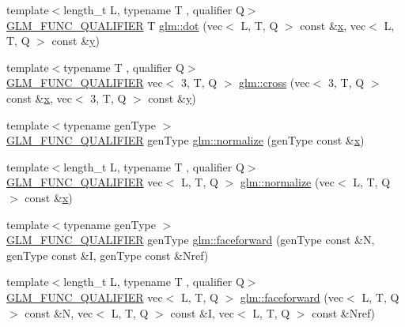 \begin{DoxyCompactItemize}
\item 
{\footnotesize template$<$length\+\_\+t L, typename T , qualifier Q$>$ }\\\hyperlink{setup_8hpp_a33fdea6f91c5f834105f7415e2a64407}{G\+L\+M\+\_\+\+F\+U\+N\+C\+\_\+\+Q\+U\+A\+L\+I\+F\+I\+ER} T \hyperlink{group__core__func__geometric_gaad6c5d9d39bdc0bf43baf1b22e147a0a}{glm\+::dot} (vec$<$ L, T, Q $>$ const \&\hyperlink{_s_d_l__opengl_8h_ad0e63d0edcdbd3d79554076bf309fd47}{x}, vec$<$ L, T, Q $>$ const \&\hyperlink{_s_d_l__opengl_8h_a1675d9d7bb68e1657ff028643b4037e3}{y})
\item 
{\footnotesize template$<$typename T , qualifier Q$>$ }\\\hyperlink{setup_8hpp_a33fdea6f91c5f834105f7415e2a64407}{G\+L\+M\+\_\+\+F\+U\+N\+C\+\_\+\+Q\+U\+A\+L\+I\+F\+I\+ER} vec$<$ 3, T, Q $>$ \hyperlink{group__core__func__geometric_gaeeec0794212fe84fc9d261de067c9587}{glm\+::cross} (vec$<$ 3, T, Q $>$ const \&\hyperlink{_s_d_l__opengl_8h_ad0e63d0edcdbd3d79554076bf309fd47}{x}, vec$<$ 3, T, Q $>$ const \&\hyperlink{_s_d_l__opengl_8h_a1675d9d7bb68e1657ff028643b4037e3}{y})
\item 
{\footnotesize template$<$typename gen\+Type $>$ }\\\hyperlink{setup_8hpp_a33fdea6f91c5f834105f7415e2a64407}{G\+L\+M\+\_\+\+F\+U\+N\+C\+\_\+\+Q\+U\+A\+L\+I\+F\+I\+ER} gen\+Type \hyperlink{namespaceglm_a213a489b64d438c533ea56f4cb2d2426}{glm\+::normalize} (gen\+Type const \&\hyperlink{_s_d_l__opengl_8h_ad0e63d0edcdbd3d79554076bf309fd47}{x})
\item 
{\footnotesize template$<$length\+\_\+t L, typename T , qualifier Q$>$ }\\\hyperlink{setup_8hpp_a33fdea6f91c5f834105f7415e2a64407}{G\+L\+M\+\_\+\+F\+U\+N\+C\+\_\+\+Q\+U\+A\+L\+I\+F\+I\+ER} vec$<$ L, T, Q $>$ \hyperlink{group__core__func__geometric_ga3b8d3dcae77870781392ed2902cce597}{glm\+::normalize} (vec$<$ L, T, Q $>$ const \&\hyperlink{_s_d_l__opengl_8h_ad0e63d0edcdbd3d79554076bf309fd47}{x})
\item 
{\footnotesize template$<$typename gen\+Type $>$ }\\\hyperlink{setup_8hpp_a33fdea6f91c5f834105f7415e2a64407}{G\+L\+M\+\_\+\+F\+U\+N\+C\+\_\+\+Q\+U\+A\+L\+I\+F\+I\+ER} gen\+Type \hyperlink{namespaceglm_ad32c7f0f9f0ca45467adbb4a1db5184d}{glm\+::faceforward} (gen\+Type const \&N, gen\+Type const \&I, gen\+Type const \&Nref)
\item 
{\footnotesize template$<$length\+\_\+t L, typename T , qualifier Q$>$ }\\\hyperlink{setup_8hpp_a33fdea6f91c5f834105f7415e2a64407}{G\+L\+M\+\_\+\+F\+U\+N\+C\+\_\+\+Q\+U\+A\+L\+I\+F\+I\+ER} vec$<$ L, T, Q $>$ \hyperlink{group__core__func__geometric_ga7aed0a36c738169402404a3a5d54e43b}{glm\+::faceforward} (vec$<$ L, T, Q $>$ const \&N, vec$<$ L, T, Q $>$ const \&I, vec$<$ L, T, Q $>$ const \&Nref)

\end{DoxyCompactItemize}
